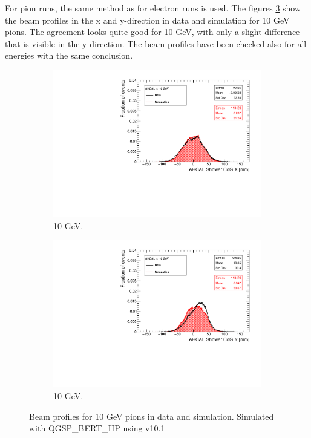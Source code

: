 For pion runs, the same method as for electron runs is used. The figures \ref{fig:BPpi} show the beam profiles in the x and y-direction in data and simulation for 10 GeV pions. The agreement looks quite good for 10 GeV, with only a slight difference that is visible in the y-direction. The beam profiles have been checked also for all energies with the same conclusion.

\begin{figure}[htbp!]
	\centering
	\begin{subfigure}[t]{0.49\textwidth}
		\includegraphics[width=1.\linewidth]{../Thesis_Plots/Timing/Pions/Plots/Run24306_CoGX_AHCAL_10GeV_Comparison.pdf}
		\caption{10 GeV.} \label{fig:pi10GeVX}
	\end{subfigure}
	\hfill
	\begin{subfigure}[t]{0.49\textwidth}
		\includegraphics[width=1.\linewidth]{../Thesis_Plots/Timing/Pions/Plots/Run24306_CoGY_AHCAL_10GeV_Comparison.pdf}
		\caption{10 GeV.} \label{fig:pi10GeVY}
	\end{subfigure}
	\caption{Beam profiles for 10 GeV pions in data and simulation. Simulated with QGSP\_BERT\_HP using \geant v10.1}
	\label{fig:BPpi}
\end{figure}

